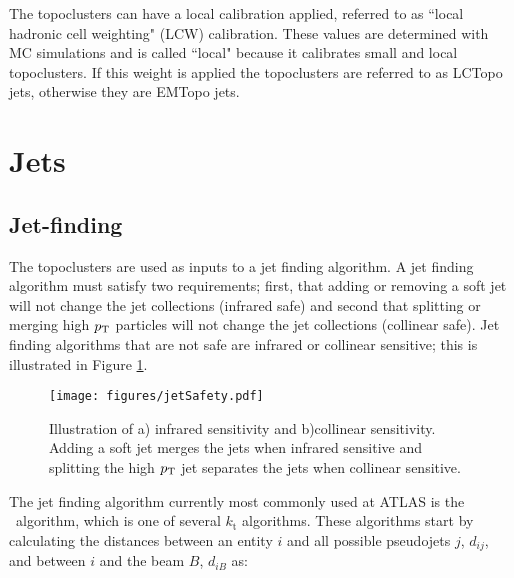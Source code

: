 The topoclusters can have a local calibration applied, referred to as ``local hadronic cell weighting" (LCW) calibration.  These values are determined with MC simulations and is called ``local" because it calibrates small and local topoclusters.  If this weight is applied the topoclusters are referred to as LCTopo jets, otherwise they are EMTopo jets. \\

\section{Jets} \label{sec:jets}

\subsection{Jet-finding}

The topoclusters are used as inputs to a jet finding algorithm.  A jet finding algorithm must satisfy two requirements; first, that adding or removing a soft jet will not change the jet collections (infrared safe) and second that splitting or merging high $p_{\mathrm{T}}$ particles will not change the jet collections (collinear safe).  Jet finding algorithms that are not safe are infrared or collinear sensitive; this is illustrated in Figure \ref{fig:jetsafety}.  \\

\begin{figure}[h]
	\centering
	\texttt{[image: figures/jetSafety.pdf]}
	\caption{Illustration of a) infrared sensitivity and b)collinear sensitivity.  Adding a soft jet merges the jets when infrared sensitive and splitting the high $p_{\mathrm{T}}$ jet separates the jets when collinear sensitive.}
	\label{fig:jetsafety}
\end{figure}

The jet finding algorithm currently most commonly used at ATLAS is the \antikt\ algorithm, which is one of several $k_{\mathrm{t}}$ algorithms.  These algorithms start by calculating the distances between an entity $i$ and all possible pseudojets $j$, $d_{ij}$, and between $i$ and the beam $B$, $d_{iB}$ as:  

